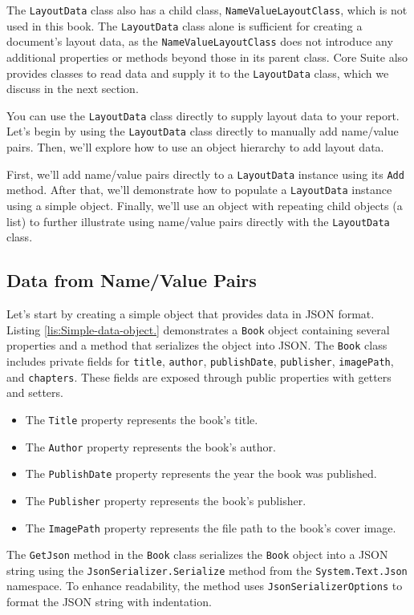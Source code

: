 \documentclass[american]{tufte-book}
\numberwithin{equation}{section}
\numberwithin{figure}{section}
\begin{document}
{{The \texttt{LayoutData} class also has a child class, \texttt{NameValueLayoutClass},
which is not used in this book. The \texttt{LayoutData} class alone
is sufficient for creating a document’s layout data, as the \texttt{NameValueLayoutClass}
does not introduce any additional properties or methods beyond those
in its parent class. Core Suite also provides classes to read data
and supply it to the \texttt{LayoutData} class, which we discuss in the next
section.

You can use the \texttt{LayoutData} class directly to supply layout
data to your report. Let’s begin by using the \texttt{LayoutData}
class directly to manually add name/value pairs. Then, we’ll explore
how to use an object hierarchy to add layout data.

First, we’ll add name/value pairs directly to a \texttt{LayoutData}
instance using its \texttt{Add} method. After that, we’ll demonstrate
how to populate a \texttt{LayoutData} instance using a simple object.
Finally, we’ll use an object with repeating child objects (a list)
to further illustrate using name/value pairs directly with the \texttt{LayoutData}
class.

\subsection{Data from Name/Value Pairs}

Let’s start by creating a simple object that provides data in JSON
format. Listing \ref{lis:Simple-data-object.} demonstrates a \texttt{Book}
object containing several properties and a method that serializes
the object into JSON. The \texttt{Book} class includes private fields
for \texttt{title}, \texttt{author}, \texttt{publishDate}, \texttt{publisher},
\texttt{imagePath}, and \texttt{chapters}. These fields are exposed
through public properties with getters and setters.
\begin{itemize}
\item The \texttt{Title} property represents the book’s title.
\item The \texttt{Author} property represents the book’s author.
\item The \texttt{PublishDate} property represents the year the book was
published.
\item The \texttt{Publisher} property represents the book’s publisher.
\item The \texttt{ImagePath} property represents the file path to the book’s
cover image.
\end{itemize}
The \texttt{GetJson} method in the \texttt{Book} class serializes
the \texttt{Book} object into a JSON string using the \texttt{JsonSerializer.Serialize}
method from the \texttt{System.Text.Json} namespace. To enhance readability,
the method uses \texttt{JsonSerializerOptions} to format the JSON
string with indentation.

}}
\end{document}
